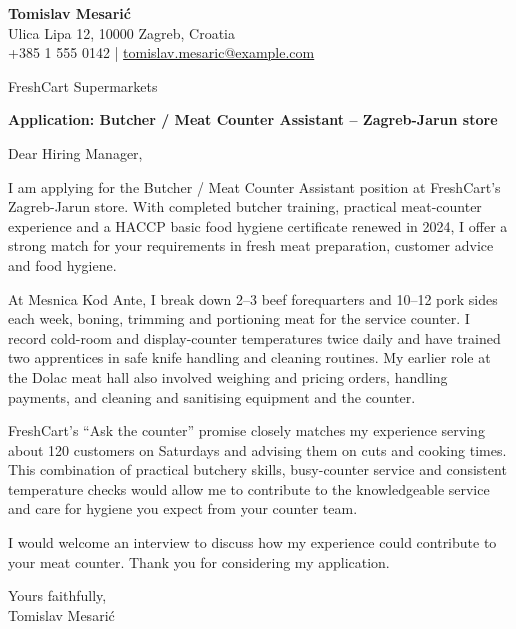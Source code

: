 \documentclass[11pt,a4paper]{article}
\begin{document}
{\Large\bfseries\color{primarycolor} Tomislav Mesarić}\\
Ulica Lipa 12, 10000 Zagreb, Croatia\\
+385 1 555 0142 | \href{mailto:tomislav.mesaric@example.com}{tomislav.mesaric@example.com}

FreshCart Supermarkets

\textbf{Application: Butcher / Meat Counter Assistant – Zagreb-Jarun store}

Dear Hiring Manager,

I am applying for the Butcher / Meat Counter Assistant position at FreshCart's Zagreb-Jarun store. With completed butcher training, practical meat-counter experience and a HACCP basic food hygiene certificate renewed in 2024, I offer a strong match for your requirements in fresh meat preparation, customer advice and food hygiene.

At Mesnica Kod Ante, I break down 2–3 beef forequarters and 10–12 pork sides each week, boning, trimming and portioning meat for the service counter. I record cold-room and display-counter temperatures twice daily and have trained two apprentices in safe knife handling and cleaning routines. My earlier role at the Dolac meat hall also involved weighing and pricing orders, handling payments, and cleaning and sanitising equipment and the counter.

FreshCart's ``Ask the counter'' promise closely matches my experience serving about 120 customers on Saturdays and advising them on cuts and cooking times. This combination of practical butchery skills, busy-counter service and consistent temperature checks would allow me to contribute to the knowledgeable service and care for hygiene you expect from your counter team.

I would welcome an interview to discuss how my experience could contribute to your meat counter. Thank you for considering my application.

Yours faithfully,\\
Tomislav Mesarić
\end{document}
